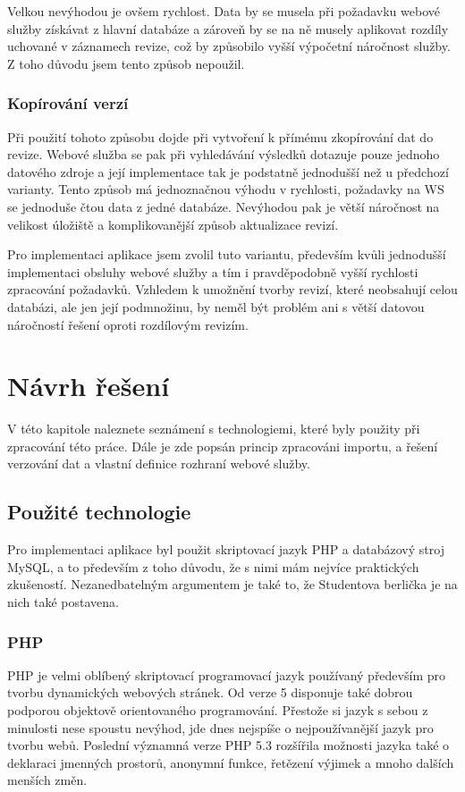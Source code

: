 \documentclass[11pt,twoside,a4paper]{book}
\begin{document}
Velkou nevýhodou je ovšem rychlost. Data by se musela při požadavku webové služby získávat z hlavní databáze a zároveň by se na ně musely aplikovat rozdíly uchované v záznamech revize, což by způsobilo vyšší výpočetní náročnost služby. Z toho důvodu jsem tento způsob nepoužil.

\subsection{Kopírování verzí}
Při použití tohoto způsobu dojde při vytvoření k přímému zkopírování dat do revize. Webové služba se pak při vyhledávání výsledků dotazuje pouze jednoho datového zdroje a její implementace tak je podstatně jednodušší než u předchozí varianty. Tento způsob má jednoznačnou výhodu v rychlosti, požadavky na WS se jednoduše čtou data z jedné databáze. Nevýhodou pak je větší náročnost na velikost úložiště a komplikovanější způsob aktualizace revizí. 

Pro implementaci aplikace jsem zvolil tuto variantu, především kvůli jednodušší implementaci obsluhy webové služby a tím i pravděpodobně vyšší rychlosti zpracování požadavků. Vzhledem k umožnění tvorby revizí, které neobsahují celou databázi, ale jen její podmnožinu, by neměl být problém ani s větší datovou náročností řešení oproti rozdílovým revizím.


\chapter{Návrh řešení}

V této kapitole naleznete seznámení s technologiemi, které byly použity při zpracování této práce. Dále je zde popsán princip zpracováni importu, a řešení verzování dat a vlastní definice rozhraní webové služby.

\section{Použité technologie}
Pro implementaci aplikace byl použit skriptovací jazyk PHP a databázový stroj MySQL, a to především z toho důvodu, že s nimi mám nejvíce praktických zkušeností. Nezanedbatelným argumentem je také to, že Studentova berlička je na nich také postavena.

\subsection{PHP}
PHP je velmi oblíbený skriptovací programovací jazyk používaný především pro tvorbu dynamických webových stránek. Od verze 5 disponuje také dobrou podporou objektově orientovaného programování. Přestože si jazyk s sebou z minulosti nese spoustu nevýhod, jde dnes nejspíše o nejpoužívanější jazyk pro tvorbu webů. Poslední významná verze PHP 5.3 rozšířila možnosti jazyka také o deklaraci jmenných prostorů, anonymní funkce, řetězení výjimek a mnoho dalších menších změn.
\end{document}
